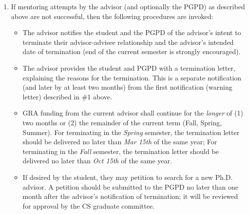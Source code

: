 \begin{enumerate}

\item If mentoring attempts by the advisor (and optionally the PGPD) as described above are not successful, then the following procedures are invoked:


\begin{itemize}
\item
  The advisor notifies the student and the PGPD of the advisor's intent to terminate their advisor-advisee relationship
  and the advisor's intended date of termination 
  (end of the current semester is strongly encouraged).
\item
  The advisor provides the student and PGPD with a termination letter, explaining the reasons for the termination. This is a separate
  notification (and later by at least two months) from the first
  notification (warning letter) described in \#1 above.

\item
  GRA funding from the current advisor shall 
  continue for the \emph{longer} of (1) two months or (2) the remainder
  of the current term (Fall, Spring, Summer).  
For terminating in the \textit{Spring} semester, 
the termination letter should be delivered no later than \textit{Mar 15th} of the same year; 
For terminating in the \textit{Fall} semester, 
the termination letter should be delivered no later than \textit{Oct 15th} of the same year. 



 
  
\item If desired by the student, they may petition to search for a new Ph.D. advisor. 
A petition should be submitted to the PGPD no later than one month after the advisor's notification of termination; 
it will be reviewed for approval by the CS graduate committee. 



\end{itemize}
\end{enumerate}

